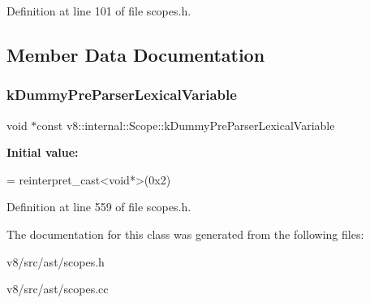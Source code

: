 Definition at line 101 of file scopes.\+h.



\subsection{Member Data Documentation}
\mbox{\label{classv8_1_1internal_1_1Scope_a79fa42b67c402f9d34247610c9ff7fbf}} 
\subsubsection{\texorpdfstring{k\+Dummy\+Pre\+Parser\+Lexical\+Variable}{kDummyPreParserLexicalVariable}}
{\footnotesize\ttfamily void $\ast$const v8\+::internal\+::\+Scope\+::k\+Dummy\+Pre\+Parser\+Lexical\+Variable\hspace{0.3cm}{\ttfamily [static]}}

{\bfseries Initial value\+:}
\begin{DoxyCode}
=
    \textcolor{keyword}{reinterpret\_cast<}\textcolor{keywordtype}{void}*\textcolor{keyword}{>}(0x2)
\end{DoxyCode}


Definition at line 559 of file scopes.\+h.



The documentation for this class was generated from the following files\+:\begin{DoxyCompactItemize}
\item 
v8/src/ast/scopes.\+h\item 
v8/src/ast/scopes.\+cc\end{DoxyCompactItemize}
